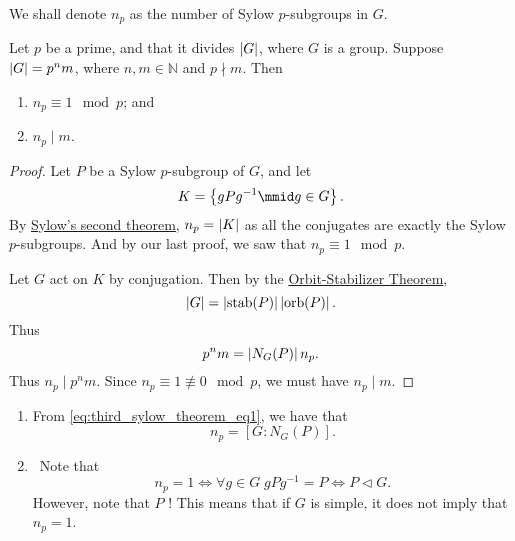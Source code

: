 \documentclass[notoc,notitlepage,nobib]{tufte-book}
\DeclareMathOperator{\stab}{stab}
\DeclareMathOperator{\orb}{orb}
\begin{document}
\begin{note}[Notation]
  We shall denote $n_p$ as the number of Sylow $p$-subgroups in $G$.
\end{note}

\begin{thm}\label{thm:third_sylow_theorem}
  Let $p$ be a prime, and that it divides $\left|G\right|$, where $G$ is a group.
  Suppose $\left|G\right| = p^n m$, where $n, m \in \mathbb{N}$ and $p \nmid m$.
  Then
  \begin{enumerate}
    \item $n_p \equiv 1 \mod p$; and
    \item $n_p \mid m$.
  \end{enumerate}
\end{thm}

\begin{proof}
  Let $P$ be a Sylow $p$-subgroup of $G$, and let
  \begin{equation*}
    K = \left\{ gPg^{-1} \mmid g \in G \right\}.
  \end{equation*}
  By \hyperref[thm:second_sylow_theorem]{Sylow's second theorem},
  $n_p = \left|K\right|$ as all the conjugates are exactly the Sylow
  $p$-subgroups. And by our last proof, we saw that $n_p \equiv 1 \mod p$.

  Let $G$ act on $K$ by conjugation. Then by the \hyperref[thm:orbit_stabilizer_theorem]{Orbit-Stabilizer Theorem},
  \begin{equation*}
    \abs{G} = \abs{\stab(P)}\abs{\orb(P)}.
  \end{equation*}
  Thus
  \begin{equation}\label{eq:third_sylow_theorem_eq1}
    p^n m = \left| N_G(P) \right| n_p.
  \end{equation}
  Thus $n_p \mid p^n m$. Since $n_p \equiv 1 \not\equiv 0 \mod p$,
  we must have $n_p \mid m$.
\end{proof}

\begin{remark}
  \begin{enumerate}
    \item From \cref{eq:third_sylow_theorem_eq1}, we have that
      \begin{equation*}
        n_p = [ G : N_G(P) ].
      \end{equation*}
    \item \imponote\ Note that
      \begin{equation*}
        n_p = 1 \iff \forall g \in G \; gPg^{-1} = P \iff P \triangleleft G.
      \end{equation*}
      However, note that $P$ ! This means that if $G$
      is simple, it does not imply that $n_p = 1$.
  \end{enumerate}
\end{remark}
\end{document}
